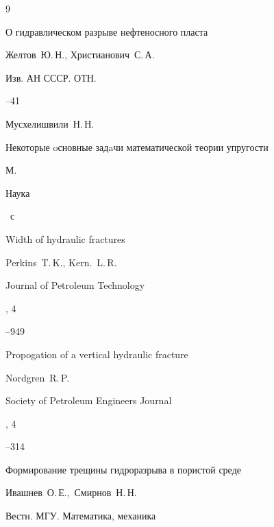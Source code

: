 \begin{thebibliography}{9}





\paper О гидравлическом разрыве нефтеносного пласта

\by   Желтов~Ю.\,Н., Христианович~С.\,А.

\jour Изв. АН СССР. ОТН.



--41




\by Мусхелишвили~Н.\,Н.

\book Некоторые oсновные задaчи математической теории упругости

\publaddr М.

\publ Наука


~с




\paper Width of hydraulic fractures 

\by   Perkins~T.\,K., Kern.~L.\,R.

\jour Journal of Petroleum Technology


, 4

--949




\paper Propogation of a vertical hydraulic fracture

\by   Nordgren~R.\,P.

\jour Society of Petroleum Engineers Journal


, 4

--314




\paper Формирование трещины гидроразрыва в пористой среде

\by   Ивашнев~О.\,Е.,~Смирнов~Н.\,Н.

\jour Вестн. МГУ. Математика, механика




\end{thebibliography}
